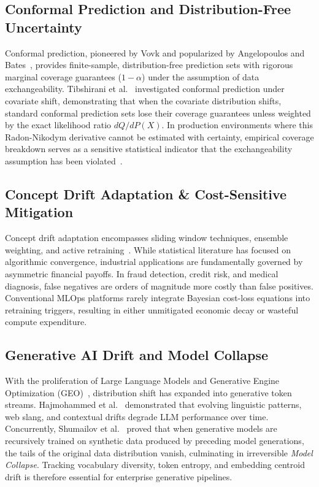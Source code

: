 \documentclass[conference]{IEEEtran}
\begin{document}
\subsection{Conformal Prediction and Distribution-Free Uncertainty}
Conformal prediction, pioneered by Vovk and popularized by Angelopoulos and Bates~\cite{angelopoulos2023conformal}, provides finite-sample, distribution-free prediction sets with rigorous marginal coverage guarantees ($1-\alpha$) under the assumption of data exchangeability. Tibshirani et al.~\cite{tibshirani2019conformal} investigated conformal prediction under covariate shift, demonstrating that when the covariate distribution shifts, standard conformal prediction sets lose their coverage guarantees unless weighted by the exact likelihood ratio $dQ/dP(X)$. In production environments where this Radon-Nikodym derivative cannot be estimated with certainty, empirical coverage breakdown serves as a sensitive statistical indicator that the exchangeability assumption has been violated~\cite{angelopoulos2023conformal}.

\subsection{Concept Drift Adaptation \& Cost-Sensitive Mitigation}
Concept drift adaptation encompasses sliding window techniques, ensemble weighting, and active retraining~\cite{gama2014survey, lu2019learning}. While statistical literature has focused on algorithmic convergence, industrial applications are fundamentally governed by asymmetric financial payoffs. In fraud detection, credit risk, and medical diagnosis, false negatives are orders of magnitude more costly than false positives. Conventional MLOps platforms rarely integrate Bayesian cost-loss equations into retraining triggers, resulting in either unmitigated economic decay or wasteful compute expenditure.

\subsection{Generative AI Drift and Model Collapse}
With the proliferation of Large Language Models and Generative Engine Optimization (GEO)~\cite{aggarwal2024geo}, distribution shift has expanded into generative token streams. Hajmohammed et al.~\cite{hajmohammed2025concept} demonstrated that evolving linguistic patterns, web slang, and contextual drifts degrade LLM performance over time. Concurrently, Shumailov et al.~\cite{shumailov2024ai} proved that when generative models are recursively trained on synthetic data produced by preceding model generations, the tails of the original data distribution vanish, culminating in irreversible \textit{Model Collapse}. Tracking vocabulary diversity, token entropy, and embedding centroid drift is therefore essential for enterprise generative pipelines.
\end{document}
